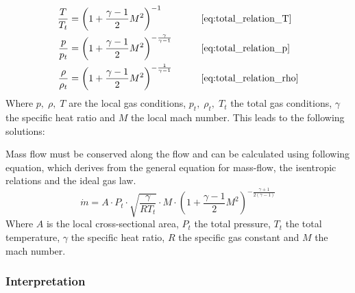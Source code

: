 	\begin{alignat*}{2}
	    \frac{T}{T_t}   & = \left( 1 + \frac{\gamma - 1}{2} M^2 \right)^{-1}
	    & \qquad & \eqref{eq:total_relation_T} \\
	    \frac{p}{p_t}   & = \left( 1 + \frac{\gamma - 1}{2} M^2 \right)^{-\frac{\gamma}{\gamma - 1}}
	    & \qquad & \eqref{eq:total_relation_p} \\
	    \frac{\rho}{\rho_t} & = \left( 1 + \frac{\gamma - 1}{2} M^2 \right)^{-\frac{1}{\gamma - 1}}
	    & \qquad & \eqref{eq:total_relation_rho}
	\end{alignat*}
	Where $p,\; \rho,\; T$ are the local gas conditions, $p_t,\; \rho_t,\; T_t$ the total gas conditions, $\gamma$ the specific heat ratio and $M$ the local mach number.
	This leads to the following solutions:
	
	Mass flow must be conserved along the flow and can be calculated using following equation, which derives from the general equation for mass-flow, the isentropic relations and the ideal gas law.
	\cite{benson_mass_nodate}
	$$
		\dot{m} = A \cdot P_t \cdot \sqrt{\frac{\gamma}{R T_t}} \cdot M \cdot \left(1 + \frac{\gamma - 1}{2} M^2\right)^{-\frac{\gamma + 1}{2(\gamma - 1)}}
	$$
	Where $A$ is the local cross-sectional area, $P_t$ the total pressure, $T_t$ the total temperature, $\gamma$ the specific heat ratio, $R$ the specific gas constant and $M$ the mach number.
	\cite{Cantwell_AA210A}

\subsubsection*{Interpretation}
